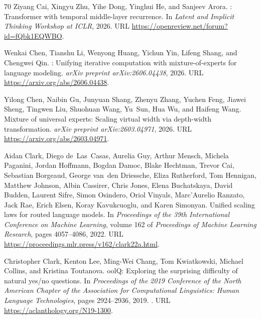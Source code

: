 \documentclass[]{bytedance_seed}
\theoremstyle{definition}
\theoremstyle{remark}
\begin{document}
\begin{thebibliography}{70}
Ziyang Cai, Xingyu Zhu, Yihe Dong, Yinghui He, and Sanjeev Arora.
: Transformer with temporal middle-layer recurrence.
\newblock In \emph{Latent and Implicit Thinking Workshop at ICLR}, 2026.
\newblock URL \url{https://openreview.net/forum?id=fQbk1EQWBO}.

Wenkai Chen, Tianshu Li, Wenyong Huang, Yichun Yin, Lifeng Shang, and Chengwei
  Qin.
: Unifying iterative computation with mixture-of-experts for
  language modeling.
\newblock \emph{arXiv preprint arXiv:2606.04438}, 2026{}.
\newblock URL \url{https://arxiv.org/abs/2606.04438}.

Yilong Chen, Naibin Gu, Junyuan Shang, Zhenyu Zhang, Yuchen Feng, Jiawei Sheng,
  Tingwen Liu, Shuohuan Wang, Yu~Sun, Hua Wu, and Haifeng Wang.
\newblock Mixture of universal experts: Scaling virtual width via depth-width
  transformation.
\newblock \emph{arXiv preprint arXiv:2603.04971}, 2026{}.
\newblock URL \url{https://arxiv.org/abs/2603.04971}.

Aidan Clark, Diego de~Las~Casas, Aurelia Guy, Arthur Mensch, Michela Paganini,
  Jordan Hoffmann, Bogdan Damoc, Blake Hechtman, Trevor Cai, Sebastian
  Borgeaud, George van~den Driessche, Eliza Rutherford, Tom Hennigan, Matthew
  Johnson, Albin Cassirer, Chris Jones, Elena Buchatskaya, David Budden,
  Laurent Sifre, Simon Osindero, Oriol Vinyals, Marc'Aurelio Ranzato, Jack Rae,
  Erich Elsen, Koray Kavukcuoglu, and Karen Simonyan.
\newblock Unified scaling laws for routed language models.
\newblock In \emph{Proceedings of the 39th International Conference on Machine
  Learning}, volume 162 of \emph{Proceedings of Machine Learning Research},
  pages 4057--4086, 2022.
\newblock URL \url{https://proceedings.mlr.press/v162/clark22a.html}.

Christopher Clark, Kenton Lee, Ming-Wei Chang, Tom Kwiatkowski, Michael
  Collins, and Kristina Toutanova.
ool{Q}: Exploring the surprising difficulty of natural yes/no
  questions.
\newblock In \emph{Proceedings of the 2019 Conference of the North American
  Chapter of the Association for Computational Linguistics: Human Language
  Technologies}, pages 2924--2936, 2019.
\newblock {}.
\newblock URL \url{https://aclanthology.org/N19-1300}.


\end{thebibliography}
\end{document}
